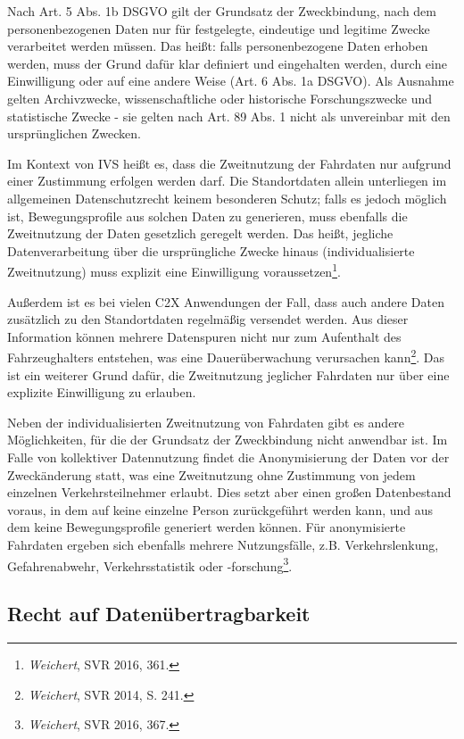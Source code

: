 Nach Art. 5 Abs. 1b DSGVO gilt der Grundsatz der Zweckbindung, nach dem personenbezogenen Daten nur für festgelegte, eindeutige und legitime Zwecke verarbeitet werden müssen. Das heißt: falls personenbezogene Daten erhoben werden, muss der Grund dafür klar definiert und eingehalten werden, durch eine Einwilligung oder auf eine andere Weise (Art. 6 Abs. 1a DSGVO). Als Ausnahme gelten Archivzwecke, wissenschaftliche oder historische Forschungszwecke und statistische Zwecke - sie gelten nach Art. 89 Abs. 1 nicht als unvereinbar mit den ursprünglichen Zwecken. 

Im Kontext von IVS heißt es, dass die Zweitnutzung der Fahrdaten nur aufgrund einer Zustimmung erfolgen werden darf. Die Standortdaten allein unterliegen im allgemeinen Datenschutzrecht keinem besonderen Schutz; falls es jedoch möglich ist, Bewegungsprofile aus solchen Daten zu generieren, muss ebenfalls die Zweitnutzung der Daten gesetzlich geregelt werden. Das heißt, jegliche Datenverarbeitung über die ursprüngliche Zwecke hinaus (individualisierte Zweitnutzung) muss explizit eine Einwilligung voraussetzen\footnote{\emph{Weichert}, SVR 2016, 361.}. \nocite{Weichert2016}

Außerdem ist es bei vielen C2X Anwendungen der Fall, dass auch andere Daten zusätzlich zu den Standortdaten regelmäßig versendet werden. Aus dieser Information können mehrere Datenspuren nicht nur zum Aufenthalt des Fahrzeughalters entstehen, was eine Dauerüberwachung verursachen kann\footnote{\emph{Weichert}, SVR 2014, S. 241.}. \nocite{Weichert2014}Das ist ein weiterer Grund dafür, die Zweitnutzung jeglicher Fahrdaten nur über eine explizite Einwilligung zu erlauben. 

Neben der individualisierten Zweitnutzung von Fahrdaten gibt es andere Möglichkeiten, für die der Grundsatz der Zweckbindung nicht anwendbar ist. Im Falle von kollektiver Datennutzung findet die Anonymisierung der Daten vor der Zweckänderung statt, was eine Zweitnutzung ohne Zustimmung von jedem einzelnen Verkehrsteilnehmer erlaubt. Dies setzt aber einen großen Datenbestand voraus, in dem auf keine einzelne Person zurückgeführt werden kann, und aus dem keine Bewegungsprofile generiert werden können. Für anonymisierte Fahrdaten ergeben sich ebenfalls mehrere Nutzungsfälle, z.B. Verkehrslenkung, Gefahrenabwehr, Verkehrsstatistik oder -forschung\footnote{\emph{Weichert}, SVR 2016, 367.}.

\subsection{Recht auf Datenübertragbarkeit}

